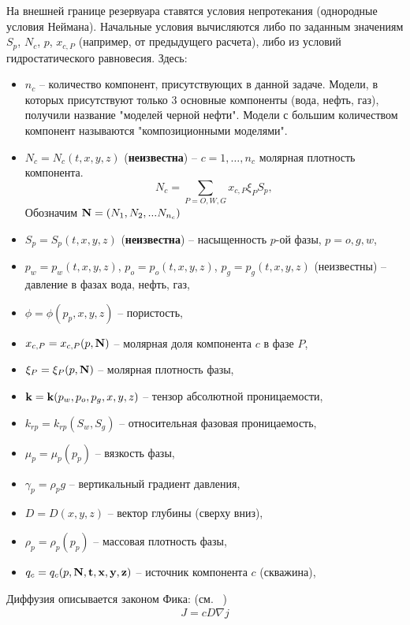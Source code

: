 \documentclass[12pt,a4paper]{article}
\begin{document}
На внешней границе резервуара ставятся условия 
непротекания (однородные условия Неймана).
Начальные условия вычисляются либо по заданным значениям $S_p$, $N_c$, $p$, $x_{c,P}$
(например, от предыдущего расчета),
либо из условий гидростатического равновесия.
Здесь:
\begin{itemize}
\item $n_c$ -- количество компонент, присутствующих в данной задаче. Модели, в которых присутствуют только 3 основные компоненты (вода, нефть, газ), получили название "моделей черной нефти". Модели с большим количеством компонент называются "композиционными моделями". \label{model_types}
\item $N_c=N_c(t,x,y,z)$ (\textbf{неизвестна}) -- $c=1,\ldots, n_c$
молярная плотность компонента.
$$
  N_c=\sum\limits_{P = O, W, G}x_{c,P}\xi_PS_p,
$$
Обозначим ${\bf N} = (N_1, N_2, ... N_{n_c})$
\item $S_p=S_p(t,x,y,z)$ (\textbf{неизвестна}) -- насыщенность $p$-ой фазы, $p=o,g,w$,
\item $p_w=p_w(t,x,y,z)$, $p_o=p_o(t,x,y,z)$, $p_g=p_g(t,x,y,z)$ (неизвестны)
 -- давление в фазах вода, нефть, газ,
\item $\phi=\phi(p_p, x,y,z)$ -- пористость,
\item $x_{c,P} = x_{c,P}(p, \bf N)$ -- молярная доля компонента  $c$ в фазе $P$,
\item $\xi_P = \xi_P(p, \bf N)$ -- молярная плотность фазы,
\item ${\bf k}={\bf k}(p_w,p_o,p_g,x,y,z)$ -- тензор абсолютной проницаемости,
\item $k_{rp}=k_{rp}(S_w,S_g)$ -- относительная фазовая проницаемость,
\item $\mu_p = \mu_p(p_p)$ -- вязкость фазы,
\item $\gamma_p = \rho_p g$ -- вертикальный градиент давления,
\item $D = D (x, y, z)$ -- вектор глубины (сверху вниз),
\item $\rho_p = \rho_p(p_p)$ -- массовая плотность фазы,
\item $q_c = q_c (p, \bf N, t, x, y, z)$ -- источник компонента $c$ (скважина),

\end{itemize}


Диффузия описывается законом Фика: (см. ~\cite{Fick})
\begin{eqnarray}
\label{Fick}
J = cD\nabla j
\end{eqnarray}
\end{document}
